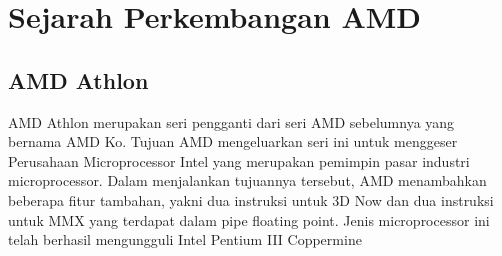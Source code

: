 \section{Sejarah Perkembangan AMD}
\subsection{AMD Athlon}
	AMD Athlon merupakan seri pengganti dari seri AMD sebelumnya yang bernama AMD Ko. Tujuan AMD mengeluarkan seri ini untuk menggeser Perusahaan Microprocessor Intel yang merupakan pemimpin pasar industri microprocessor. Dalam menjalankan tujuannya tersebut, AMD menambahkan beberapa fitur tambahan, yakni dua instruksi untuk 3D Now dan dua instruksi untuk MMX yang terdapat dalam pipe floating point. Jenis microprocessor ini telah berhasil mengungguli Intel Pentium III Coppermine 